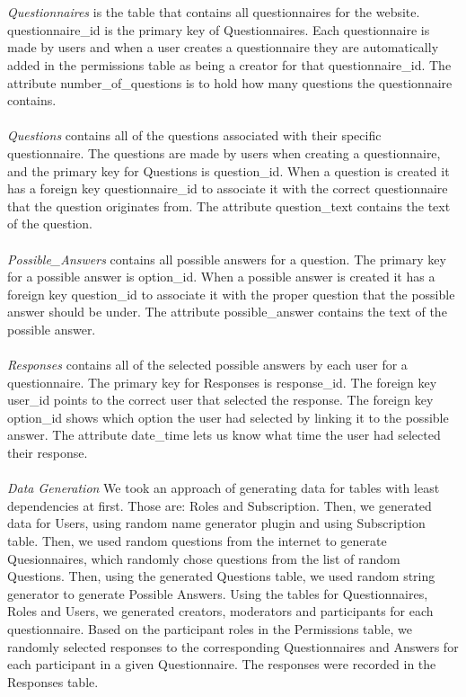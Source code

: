 \documentclass[12pt, oneside, a4paper]{article}
\begin{document}
    \\
    \\
    \emph{Questionnaires} is the table that contains all questionnaires for the website. questionnaire\_id is the primary key of Questionnaires. Each questionnaire is made by users and when a user creates a questionnaire they are automatically added in the permissions table as being a creator for that questionnaire\_id.  The attribute number\_of\_questions is to hold how many questions the questionnaire contains.
    \\
    \\
    \emph{Questions} contains all of the questions associated with their specific questionnaire. The questions are made by users when creating a questionnaire, and the primary key for Questions is question\_id. When a question is created it has a foreign key questionnaire\_id to associate it with the correct questionnaire that the question originates from. The attribute question\_text contains the text of the question.
    \\
    \\
    \emph{Possible\_Answers} contains all possible answers for a question. The primary key for a possible answer is option\_id. When a possible answer is created it has a foreign key question\_id to associate it with the proper question that the possible answer should be under. The attribute possible\_answer contains the text of the possible answer.
    \\
    \\
    \emph{Responses} contains all of the selected possible answers by each user for a questionnaire. The primary key for Responses is response\_id. The foreign key user\_id points to the correct user that selected the response. The foreign key option\_id shows which option the user had selected by linking it to the possible answer. The attribute date\_time lets us know what time the user had selected their response.
    \\
    \\
    \emph{Data Generation}
    We took an approach of generating data for tables with least dependencies at first. Those are: Roles and Subscription. Then, we generated data for Users, using random name generator plugin and using Subscription table. Then, we used random questions from the internet to generate Quesionnaires, which randomly chose questions from the list of random Questions. Then, using the generated Questions table, we used random string generator to generate Possible Answers. Using the tables for Questionnaires, Roles and Users, we generated creators, moderators and participants for each questionnaire. Based on the participant roles in the Permissions table, we randomly selected responses to the corresponding Questionnaires and Answers for each participant in a given Questionnaire. The responses were recorded in the Responses table. 
\end{document}

